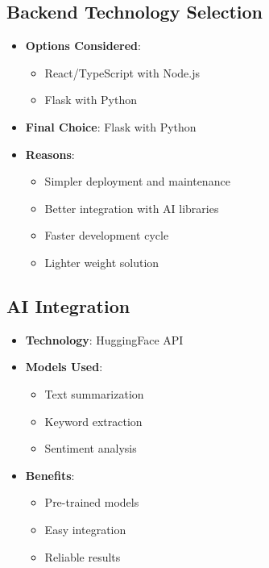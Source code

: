 \documentclass[12pt,a4paper]{article}
\begin{document}
\subsection{Backend Technology Selection}
\begin{itemize}
    \item \textbf{Options Considered}:
    \begin{itemize}
        \item React/TypeScript with Node.js
        \item Flask with Python
    \end{itemize}
    \item \textbf{Final Choice}: Flask with Python
    \item \textbf{Reasons}:
    \begin{itemize}
        \item Simpler deployment and maintenance
        \item Better integration with AI libraries
        \item Faster development cycle
        \item Lighter weight solution
    \end{itemize}
\end{itemize}

\subsection{AI Integration}
\begin{itemize}
    \item \textbf{Technology}: HuggingFace API
    \item \textbf{Models Used}:
    \begin{itemize}
        \item Text summarization
        \item Keyword extraction
        \item Sentiment analysis
    \end{itemize}
    \item \textbf{Benefits}:
    \begin{itemize}
        \item Pre-trained models
        \item Easy integration
        \item Reliable results
    \end{itemize}
\end{itemize}
\end{document}
